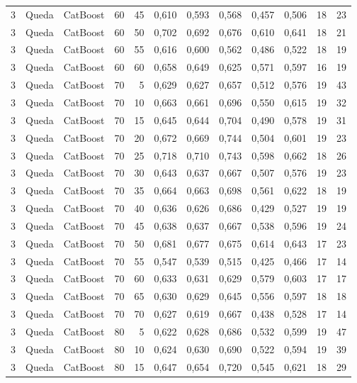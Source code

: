 \begin{longtable}{@{}rllrrrrrrrrr@{}}
3 & Queda & CatBoost & 60 & 45 & 0,610 & 0,593 & 0,568 & 0,457 & 0,506 & 18 & 23 \\
3 & Queda & CatBoost & 60 & 50 & 0,702 & 0,692 & 0,676 & 0,610 & 0,641 & 18 & 21 \\
3 & Queda & CatBoost & 60 & 55 & 0,616 & 0,600 & 0,562 & 0,486 & 0,522 & 18 & 19 \\
3 & Queda & CatBoost & 60 & 60 & 0,658 & 0,649 & 0,625 & 0,571 & 0,597 & 16 & 19 \\
3 & Queda & CatBoost & 70 & 5 & 0,629 & 0,627 & 0,657 & 0,512 & 0,576 & 19 & 43 \\
3 & Queda & CatBoost & 70 & 10 & 0,663 & 0,661 & 0,696 & 0,550 & 0,615 & 19 & 32 \\
3 & Queda & CatBoost & 70 & 15 & 0,645 & 0,644 & 0,704 & 0,490 & 0,578 & 19 & 31 \\
3 & Queda & CatBoost & 70 & 20 & 0,672 & 0,669 & 0,744 & 0,504 & 0,601 & 19 & 23 \\
3 & Queda & CatBoost & 70 & 25 & 0,718 & 0,710 & 0,743 & 0,598 & 0,662 & 18 & 26 \\
3 & Queda & CatBoost & 70 & 30 & 0,643 & 0,637 & 0,667 & 0,507 & 0,576 & 19 & 23 \\
3 & Queda & CatBoost & 70 & 35 & 0,664 & 0,663 & 0,698 & 0,561 & 0,622 & 18 & 19 \\
3 & Queda & CatBoost & 70 & 40 & 0,636 & 0,626 & 0,686 & 0,429 & 0,527 & 19 & 19 \\
3 & Queda & CatBoost & 70 & 45 & 0,638 & 0,637 & 0,667 & 0,538 & 0,596 & 19 & 24 \\
3 & Queda & CatBoost & 70 & 50 & 0,681 & 0,677 & 0,675 & 0,614 & 0,643 & 17 & 23 \\
3 & Queda & CatBoost & 70 & 55 & 0,547 & 0,539 & 0,515 & 0,425 & 0,466 & 17 & 14 \\
3 & Queda & CatBoost & 70 & 60 & 0,633 & 0,631 & 0,629 & 0,579 & 0,603 & 17 & 17 \\
3 & Queda & CatBoost & 70 & 65 & 0,630 & 0,629 & 0,645 & 0,556 & 0,597 & 18 & 18 \\
3 & Queda & CatBoost & 70 & 70 & 0,627 & 0,619 & 0,667 & 0,438 & 0,528 & 17 & 14 \\
3 & Queda & CatBoost & 80 & 5 & 0,622 & 0,628 & 0,686 & 0,532 & 0,599 & 19 & 47 \\
3 & Queda & CatBoost & 80 & 10 & 0,624 & 0,630 & 0,690 & 0,522 & 0,594 & 19 & 39 \\
3 & Queda & CatBoost & 80 & 15 & 0,647 & 0,654 & 0,720 & 0,545 & 0,621 & 18 & 29 \\

\end{longtable}
